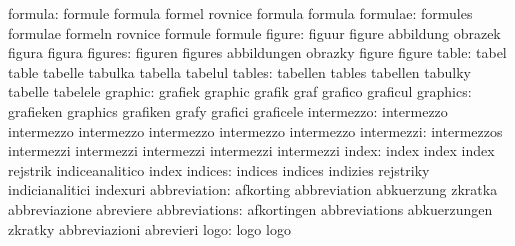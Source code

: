                   formula: formule                   formula
                           formel                    rovnice
                           formula                   formula
                 formulae: formules                  formulae
                           formeln                   rovnice
                           formule                   formule
                   figure: figuur                    figure
                           abbildung                 obrazek
                           figura                    figura
                  figures: figuren                   figures
                           abbildungen               obrazky
                           figure                    figure
                    table: tabel                     table
                           tabelle                   tabulka
                           tabella                   tabelul
                   tables: tabellen                  tables
                           tabellen                  tabulky
                           tabelle                   tabelele
                  graphic: grafiek                   graphic
                           grafik                    graf
                           grafico                   graficul
                 graphics: grafieken                 graphics
                           grafiken                  grafy
                           grafici                   graficele
               intermezzo: intermezzo                intermezzo
                           intermezzo                intermezzo
                           intermezzo                intermezzo
               intermezzi: intermezzos               intermezzi
                           intermezzi                intermezzi
                           intermezzi                intermezzi
                    index: index                     index
                           index                     rejstrik
                           indiceanalitico           index
                  indices: indices                   indices
                           indizies                  rejstriky
                           indicianalitici           indexuri
             abbreviation: afkorting                 abbreviation
                           abkuerzung                zkratka
                           abbreviazione             abreviere
            abbreviations: afkortingen               abbreviations
                           abkuerzungen              zkratky
                           abbreviazioni             abrevieri
                     logo: logo                      logo
